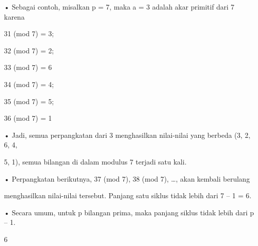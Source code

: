 \documentclass{article}
\begin{document}

• Sebagai contoh, misalkan p = 7, maka a = 3 adalah akar primitif dari 7 karena

31 (mod 7) = 3;

32 (mod 7) = 2;

33 (mod 7) = 6

34 (mod 7) = 4;

35 (mod 7) = 5;

36 (mod 7) = 1

• Jadi, semua perpangkatan dari 3 menghasilkan nilai-nilai yang berbeda (3, 2, 6, 4, 

5, 1), semua bilangan di dalam modulus 7 terjadi satu kali. 

• Perpangkatan berikutnya, 37 (mod 7), 38 (mod 7), …, akan kembali berulang 

menghasilkan nilai-nilai tersebut.  Panjang satu siklus tidak lebih dari 7 – 1 = 6.

• Secara umum, untuk p bilangan prima, maka panjang siklus tidak lebih dari p – 1.  

6
\end{document}
